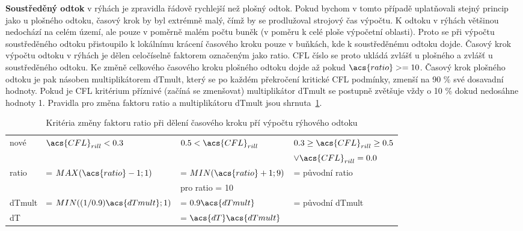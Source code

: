   {\bf Soustředěný odtok} v  rýhách je zpravidla řádově rychlejší než plošný odtok. Pokud bychom v tomto případě uplatňovali stejný princip jako u plošného odtoku, časový krok by byl extrémně malý, čímž by se prodlužoval strojový čas výpočtu. K odtoku v rýhách většinou nedochází na celém území, ale pouze v poměrně malém počtu buněk (v poměru k celé ploše výpočetní oblasti). Proto se při výpočtu soustředěného odtoku přistoupilo k lokálnímu krácení časového kroku pouze v buňkách, kde k soustředěnému odtoku dojde. Časový krok výpočtu odtoku v rýhách je dělen celočíselně faktorem označeným jako \acs{ratio}.  \acs{CFL} číslo se proto ukládá zvlášť u plošného a zvlášť u soustředěného odtoku. Ke změně celkového časového kroku plošného odtoku dojde až pokud $\acs{ratio} >= 10$. Časový krok plošného odtoku je pak násoben multiplikátorem \acs{dTmult}, který se po každém překročení kritické \acs{CFL} podmínky, zmenší na 90 \% své dosavadní hodnoty. Pokud je \acs{CFL} kritérium příznivé (začíná se zmenšovat) multiplikátor \acs{dTmult} se postupně zvětšuje vždy o 10 \% dokud nedosáhne hodnoty 1. Pravidla pro změna faktoru \acs{ratio} a multiplikátoru \acs{dTmult} jsou shrnuta~\ref{tab:cflrill}.
  \begin{table}[t!]
    \centering
    \caption{Kritéria změny faktoru \acs{ratio} při dělení časového kroku pří výpočtu rýhového odtoku}
    \label{tab:cflrill}
    {\small
    \begin{tabular}{llll}
      \hline
        nové  &  $\acs{CFL}_{rill} < 0.3 $ & $ 0.5 < \acs{CFL}_{rill}$ & $ 0.3 \geq \acs{CFL}_{rill} \geq 0.5 $ \\
        & & & $\lor \acs{CFL}_{rill} = 0.0 $ \\
        \hline
        \hline
        \acs{ratio} &  = $MAX(\acs{ratio} - 1;1)$ &  = $MIN(\acs{ratio} + 1;9)$ & = původní \acs{ratio}\\
                     &                              &  pro \acs{ratio} = 10  &                            \\
        \acs{dTmult} &  = $MIN((1/0.9)\acs{dTmult};1)$ &  = $0.9\acs{dTmult}$ & = původní \acs{dTmult}\\
        \acs{dT}    &  & \multicolumn{2}{l}{= $\acs{dT}\acs{dTmult}$} \\
        \hline
        
    \end{tabular}
    }
  \end{table}
  
